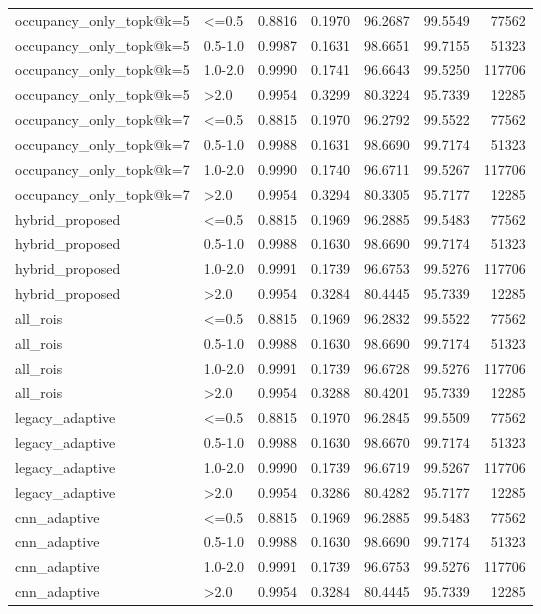 \begin{tabular}{llrrrrr}
occupancy_only_topk@k=5 & <=0.5 & 0.8816 & 0.1970 & 96.2687 & 99.5549 & 77562 \\
occupancy_only_topk@k=5 & 0.5-1.0 & 0.9987 & 0.1631 & 98.6651 & 99.7155 & 51323 \\
occupancy_only_topk@k=5 & 1.0-2.0 & 0.9990 & 0.1741 & 96.6643 & 99.5250 & 117706 \\
occupancy_only_topk@k=5 & >2.0 & 0.9954 & 0.3299 & 80.3224 & 95.7339 & 12285 \\
occupancy_only_topk@k=7 & <=0.5 & 0.8815 & 0.1970 & 96.2792 & 99.5522 & 77562 \\
occupancy_only_topk@k=7 & 0.5-1.0 & 0.9988 & 0.1631 & 98.6690 & 99.7174 & 51323 \\
occupancy_only_topk@k=7 & 1.0-2.0 & 0.9990 & 0.1740 & 96.6711 & 99.5267 & 117706 \\
occupancy_only_topk@k=7 & >2.0 & 0.9954 & 0.3294 & 80.3305 & 95.7177 & 12285 \\
hybrid_proposed & <=0.5 & 0.8815 & 0.1969 & 96.2885 & 99.5483 & 77562 \\
hybrid_proposed & 0.5-1.0 & 0.9988 & 0.1630 & 98.6690 & 99.7174 & 51323 \\
hybrid_proposed & 1.0-2.0 & 0.9991 & 0.1739 & 96.6753 & 99.5276 & 117706 \\
hybrid_proposed & >2.0 & 0.9954 & 0.3284 & 80.4445 & 95.7339 & 12285 \\
all_rois & <=0.5 & 0.8815 & 0.1969 & 96.2832 & 99.5522 & 77562 \\
all_rois & 0.5-1.0 & 0.9988 & 0.1630 & 98.6690 & 99.7174 & 51323 \\
all_rois & 1.0-2.0 & 0.9991 & 0.1739 & 96.6728 & 99.5276 & 117706 \\
all_rois & >2.0 & 0.9954 & 0.3288 & 80.4201 & 95.7339 & 12285 \\
legacy_adaptive & <=0.5 & 0.8815 & 0.1970 & 96.2845 & 99.5509 & 77562 \\
legacy_adaptive & 0.5-1.0 & 0.9988 & 0.1630 & 98.6670 & 99.7174 & 51323 \\
legacy_adaptive & 1.0-2.0 & 0.9990 & 0.1739 & 96.6719 & 99.5267 & 117706 \\
legacy_adaptive & >2.0 & 0.9954 & 0.3286 & 80.4282 & 95.7177 & 12285 \\
cnn_adaptive & <=0.5 & 0.8815 & 0.1969 & 96.2885 & 99.5483 & 77562 \\
cnn_adaptive & 0.5-1.0 & 0.9988 & 0.1630 & 98.6690 & 99.7174 & 51323 \\
cnn_adaptive & 1.0-2.0 & 0.9991 & 0.1739 & 96.6753 & 99.5276 & 117706 \\
cnn_adaptive & >2.0 & 0.9954 & 0.3284 & 80.4445 & 95.7339 & 12285 \\
\bottomrule
\end{tabular}
